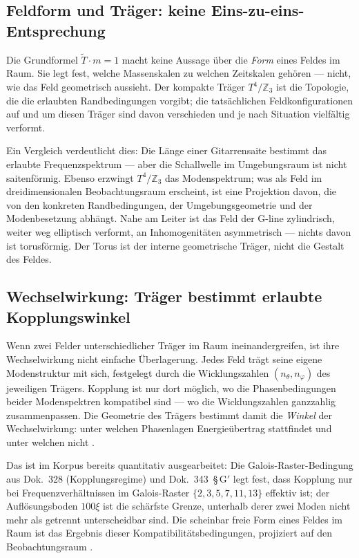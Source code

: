 \subsection*{Feldform und Träger: keine Eins-zu-eins-Entsprechung}

Die Grundformel $\tilde{T}\cdot m=1$ macht keine Aussage über die
\emph{Form} eines Feldes im Raum. Sie legt fest, welche Massenskalen
zu welchen Zeitskalen gehören --- nicht, wie das Feld geometrisch
aussieht. Der kompakte Träger $T^4/\mathbb{Z}_3$ ist die Topologie,
die die erlaubten Randbedingungen vorgibt; die tatsächlichen
Feldkonfigurationen auf und um diesen Träger sind davon verschieden
und je nach Situation vielfältig verformt.

Ein Vergleich verdeutlicht dies: Die Länge einer Gitarrensaite bestimmt
das erlaubte Frequenzspektrum --- aber die Schallwelle im Umgebungsraum
ist nicht saitenförmig. Ebenso erzwingt $T^4/\mathbb{Z}_3$ das
Modenspektrum; was als Feld im dreidimensionalen Beobachtungsraum
erscheint, ist eine Projektion davon, die von den konkreten
Randbedingungen, der Umgebungsgeometrie und der Modenbesetzung
abhängt. Nahe am Leiter ist das Feld der G-line zylindrisch, weiter
weg elliptisch verformt, an Inhomogenitäten asymmetrisch --- nichts
davon ist torusförmig. Der Torus ist der interne geometrische Träger,
nicht die Gestalt des Feldes.

\subsection*{Wechselwirkung: Träger bestimmt erlaubte Kopplungswinkel}

Wenn zwei Felder unterschiedlicher Träger im Raum ineinandergreifen,
ist ihre Wechselwirkung nicht einfache Überlagerung. Jedes Feld trägt
seine eigene Modenstruktur mit sich, festgelegt durch die
Wicklungszahlen $(n_\theta, n_\varphi)$ des jeweiligen Trägers.
Kopplung ist nur dort möglich, wo die Phasenbedingungen beider
Modenspektren kompatibel sind --- wo die Wicklungszahlen ganzzahlig
zusammenpassen. Die Geometrie des Trägers bestimmt damit die
\emph{Winkel} der Wechselwirkung: unter welchen Phasenlagen
Energieübertrag stattfindet und unter welchen nicht \SM.

Das ist im Korpus bereits quantitativ ausgearbeitet: Die
Galois-Raster-Bedingung aus Dok.~328 (Kopplungsregime) und
Dok.~343~\S\,G$'$ legt fest, dass Kopplung nur bei Frequenzverhältnissen
im Galois-Raster $\{2,3,5,7,11,13\}$ effektiv ist; der Auflösungsboden
$100\xi$ ist die schärfste Grenze, unterhalb derer zwei Moden nicht
mehr als getrennt unterscheidbar sind. Die scheinbar freie Form
eines Feldes im Raum ist das Ergebnis dieser Kompatibilitätsbedingungen,
projiziert auf den Beobachtungsraum \SM.

